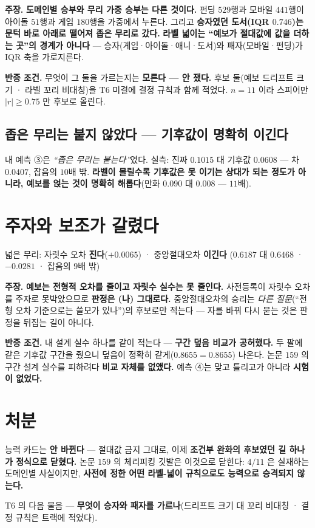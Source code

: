 \documentclass[10pt,a4paper]{article}
\newcommand{\claim}[2]{\begin{claimbox}\textbf{주장.} #1\par\smallskip
  \textcolor{gray!70}{\textbf{반증 조건.} #2}\end{claimbox}}
\begin{document}
\claim{\textbf{도메인별 승부와 무리 가중 승부는 다른 것이다.} 펀딩 $529$행과
모바일 $441$행이 아이돌 $51$행과 게임 $180$행을 가중에서 누른다. 그리고
\textbf{승자였던 도서(IQR $0.746$)는 문턱 바로 아래로 떨어져 좁은 무리로 갔다.}
\textbf{라벨 넓이는 ``예보가 절대값에 값을 더하는 곳''의 경계가 아니다} ---
승자(게임·아이돌·애니·도서)와 패자(모바일·펀딩)가 IQR 축을 가로지른다.}
{무엇이 그 둘을 가르는지는 \textbf{모른다 --- 안 쟀다.} 후보 둘(예보 드리프트
크기 · 라벨 꼬리 비대칭)을 T$6$ 미결에 결정 규칙과 함께 적었다. $n{=}11$ 이라
스피어만 $|r| \geq 0.75$ 만 후보로 올린다.}

\subsection*{좁은 무리는 붙지 않았다 --- 기후값이 명확히 이긴다}

내 예측 ③은 \emph{``좁은 무리는 붙는다''}였다. 실측: 진짜 $0.1015$ 대 기후값
$\mathbf{0.0608}$ --- 차 $0.0407$, 잡음의 $10$배 밖. \textbf{라벨이 몰릴수록
기후값은 못 이기는 상대가 되는 정도가 아니라, 예보를 얹는 것이 명확히
해롭다}(만화 $0.090$ 대 $0.008$ --- $11$배).

\section{주자와 보조가 갈렸다}

\begin{center}
넓은 무리: 자릿수 오차 \textbf{진다}($+0.0065$) · 중앙절대오차 \textbf{이긴다}
($0.6187$ 대 $0.6468$ · $-0.0281$ · 잡음의 $9$배 밖)
\end{center}

\claim{\textbf{예보는 전형적 오차를 줄이고 자릿수 실수는 못 줄인다.} 사전등록이
자릿수 오차를 주자로 못박았으므로 \textbf{판정은 (나) 그대로다.} 중앙절대오차의
승리는 \emph{다른 질문}(``전형 오차 기준으로는 쓸모가 있나'')의 후보로만 적는다
--- 자를 바꿔 다시 묻는 것은 판정을 뒤집는 길이 아니다.}
{내 설계 실수 하나를 같이 적는다 --- \textbf{구간 덮음 비교가 공허했다.} 두 팔에
같은 기후값 구간을 줬으니 덮음이 정확히 같게($0.8655 = 0.8655$) 나온다. 논문
$159$ 의 구간 설계 실수를 피하려다 \textbf{비교 자체를 없앴다.} 예측 ④는 맞고
틀리고가 아니라 \textbf{시험이 없었다.}}

\section{처분}

능력 카드는 \textbf{안 바뀐다} --- 절대값 금지 그대로, 이제 \textbf{조건부 완화의
후보였던 길 하나가 정식으로 닫혔다.} 논문 $159$ 의 체리피킹 깃발은 이것으로
닫힌다: $4/11$ 은 실재하는 도메인별 사실이지만, \textbf{사전에 정한 어떤 라벨-넓이
규칙으로도 능력으로 승격되지 않는다.}

\begin{center}
T$6$ 의 다음 물음 --- \textbf{무엇이 승자와 패자를 가르나}(드리프트 크기 대 꼬리
비대칭 · 결정 규칙은 트랙에 적었다).
\end{center}
\end{document}
